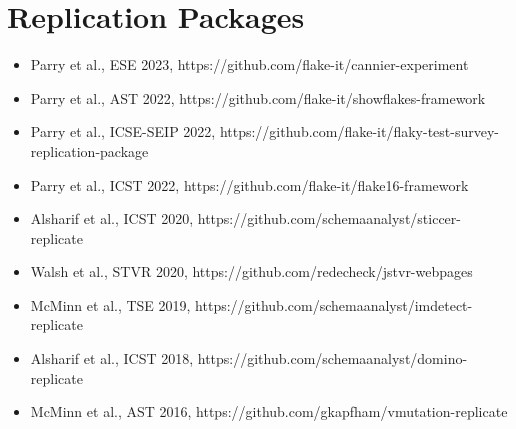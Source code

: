 \documentclass[11pt,letterpaper,sans]{moderncv}
\begin{document}




%
\vspace*{-.2in}
%
\section{Replication Packages}

\begin{itemize} \renewcommand\labelitemi{\Large\textbullet}

  \setlength\itemsep{0.5em}

  \item Parry et al., ESE 2023, https://github.com/flake-it/cannier-experiment

  \item Parry et al., AST 2022, https://github.com/flake-it/showflakes-framework

  \item Parry et al., ICSE-SEIP 2022, https://github.com/flake-it/flaky-test-survey-replication-package

  \item Parry et al., ICST 2022, https://github.com/flake-it/flake16-framework

  \item Alsharif et al., ICST 2020, https://github.com/schemaanalyst/sticcer-replicate

  \item Walsh et al., STVR 2020, https://github.com/redecheck/jstvr-webpages

  \item McMinn et al., TSE 2019, https://github.com/schemaanalyst/imdetect-replicate

  \item Alsharif et al., ICST 2018, https://github.com/schemaanalyst/domino-replicate

  \item McMinn et al., AST 2016, https://github.com/gkapfham/vmutation-replicate

\end{itemize}
\end{document}

